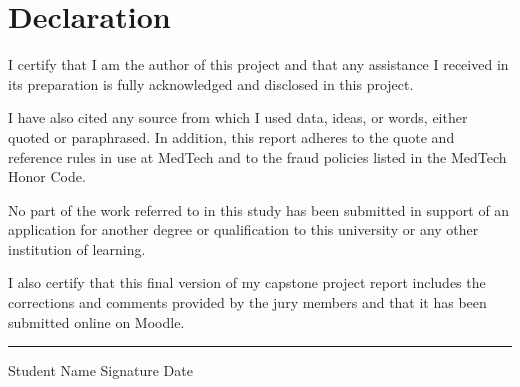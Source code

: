 \section*{\hfill Declaration \hfill}

\vspace{1.4cm}

\large
\noindent
I certify that I am the author of this project and that any assistance I received in its preparation is fully acknowledged and disclosed in this project.

\vspace{1cm}
\noindent
I have also cited any source from which I used data, ideas, or words, either quoted or paraphrased. In addition, this report adheres to the quote and reference rules in use at MedTech and to the fraud policies listed in the MedTech Honor Code.

\vspace{1cm}
\noindent
No part of the work referred to in this study has been submitted in support of an application for another degree or qualification to this university or any other institution of learning.

\vspace{1cm}
\noindent
I also certify that this final version of my capstone project report includes the corrections and comments provided by the jury members and that it has been submitted online on Moodle.

\normalsize
\vspace{2cm}
\hrule
\vspace{0.2cm}
\noindent Student Name \hspace{7cm} Signature \hspace{3cm} Date
